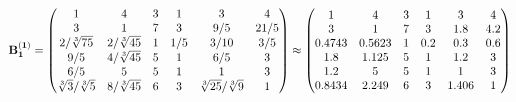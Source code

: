 \documentclass[10pt,a4paper]{article}
\begin{document}
	\[
		\bold{B_1^{(1)}} = 
		\begin{pmatrix}
			{1}{} & {{4}}{} & {{3}}{} & {1}{} & {{3}}{} & {{4}}{} \\
			{{3}}{} & {1}{} & {{7}}{} & {{3}}{} & {{9}} / {{5}} & {{21}} / {{5}} \\
			{{2}} / {\sqrt[3]{75}} & {{2}} / {\sqrt[3]{45}} & {1}{} & {1} / {{5}} & {{3}} / {{10}} & {{3}} / {{5}} \\
			{{9}} / {{5}} & {{4}} / {\sqrt[3]{45}} & {{5}}{} & {1}{} & {{6}} / {{5}} & {{3}}{} \\
			{{6}} / {{5}} & {{5}}{} & {{5}}{} & {1}{} & {1}{} & {{3}}{} \\
			{\sqrt[3]{3}} / {\sqrt[3]{5}} & {{8}} / {\sqrt[3]{45}} & {{6}}{} & {{3}}{} & {\sqrt[3]{25}} / {\sqrt[3]{9}} & {1}{} \\
		\end{pmatrix}
		\approx
		\begin{pmatrix}
			1        & 4        & 3        & 1        & 3        & 4        \\
			3        & 1        & 7        & 3        & 1.8      & 4.2      \\
			0.4743   & 0.5623   & 1        & 0.2      & 0.3      & 0.6      \\
			1.8      & 1.125    & 5        & 1        & 1.2      & 3        \\
			1.2      & 5        & 5        & 1        & 1        & 3        \\
			0.8434   & 2.249    & 6        & 3        & 1.406    & 1        \\
		\end{pmatrix}
	\]
\end{document}
